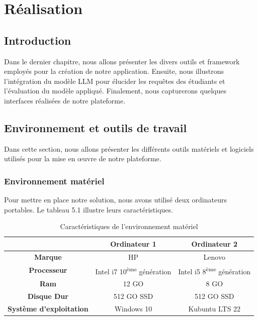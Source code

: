 \vfill 
\chapter{Réalisation}
\label{chap:conception}
\mtcaddchapter
\section*{Introduction}
\justifying
Dans le dernier chapitre, nous allons présenter les divers outils et framework employés pour la création de notre application. Ensuite, nous illustrons l'intégration  du modèle LLM pour élucider les requêtes des étudiants et l’évaluation du modèle appliqué. Finalement, nous capturerons  quelques interfaces réalisées de notre plateforme.

\section{Environnement et outils de travail}
\justifying
Dans cette section, nous allons présenter les différents outils matériels et logiciels utilisés pour la mise en œuvre de notre plateforme.
\subsection{Environnement matériel }
Pour mettre en place notre solution, nous avons utilisé deux ordinateurs portables. Le tableau 5.1 illustre leurs caractéristiques.
\begin{longtable}{|c|c|c|}
    \caption{Caractéristiques de l’environnement matériel} \\
    \hline
    \rowcolor{gray!25}
    & \textbf{Ordinateur 1} & \textbf{Ordinateur 2} \\
    \hline
    \cellcolor{gray!25}\textbf{Marque} & HP & Lenovo \\
    \hline
    \cellcolor{gray!25}\textbf{Processeur} & Intel i7 10\textsuperscript{ème} génération & Intel i5 8\textsuperscript{ème} génération \\
    \hline
    \cellcolor{gray!25}\textbf{Ram} & 12 GO & 8 GO \\
    \hline
    \cellcolor{gray!25}\textbf{Disque Dur} & 512 GO SSD & 512 GO SSD \\
    \hline
    \cellcolor{gray!25}\textbf{Système d’exploitation} & Windows 10 & Kubuntu LTS 22 \\
    \hline
\end{longtable}

